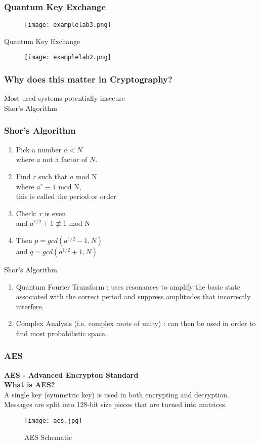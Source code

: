 \documentclass{beamer}
\begin{document}
\begin{frame}
\frametitle{Quantum Key Exchange}
\begin{figure}[h]
\centering
\texttt{[image: examplelab3.png]}
\end{figure}
\end{frame}
\begin{frame}{Quantum Key Exchange}
\begin{figure}[h]
\centering
\texttt{[image: examplelab2.png]}
\end{figure}
\end{frame}
\begin{frame}
\frametitle{Why does this matter in Cryptography?}
Most used systems potentially insecure\\
Shor's Algorithm
\end{frame}

\begin{frame}
\frametitle{Shor's Algorithm}
    \begin{enumerate}
        \item Pick a number $a < N$ \\
    where $a$ not a factor of $N$. \pause
        \item Find $r$ such that $a\text{ mod N}$ \\
    where $a^r \equiv 1\text{ mod N}$, \\
    this is called the period or order \pause
        \item Check: $r$ is even \\
    and $a^{1/2}+1 \not \equiv 1 \text{ mod N}$ \pause
        \item Then $p=gcd(a^{1/2}-1, N)$ \\
    and $q=gcd(a^{1/2}+1, N)$ 
    \end{enumerate}
\end{frame}
\begin{frame}{Shor's Algorithm}
    \begin{enumerate}
        \item Quantum Fourier Transform : uses resonances to amplify the basic state associated with the correct period and suppress amplitudes that incorrectly interfere.\pause
        \item Complex Analysis (i.e. complex roots of unity) : can then be used in order to find most probabilistic space.
    \end{enumerate}
\end{frame}


\begin{frame}
\frametitle{AES}
{\bf AES - Advanced Encrypton Standard}\\
{\bf What is AES?}\\
A single key (symmetric key) is used in both encrypting and decryption. Messages are split into 128-bit size pieces that are turned into matrices.\\
\begin{figure}[h]
\caption{AES Schematic}
\centering
\texttt{[image: aes.jpg]}
\end{figure}
\end{frame}
\end{document}
